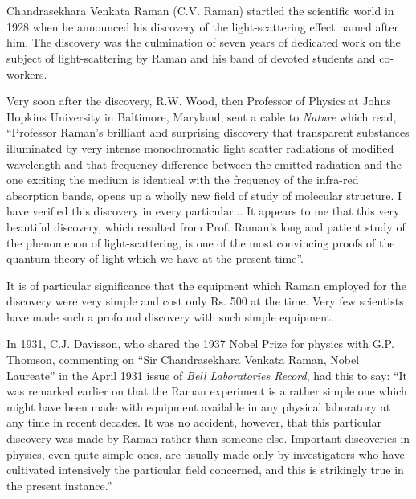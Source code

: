 \chapter{}\label{chap1}

\smallskip




\noindent
Chandrasekhara Venkata Raman (C.V. Raman) startled the scientific world in 1928 when he announced his discovery of the  light-scattering effect named after him. The discovery was the culmination of seven years of dedicated work on the subject of light-scattering by Raman and his band of devoted students and co-workers.

Very soon after the discovery, R.W. Wood, then Professor of Physics at Johns Hopkins University in Baltimore, \hbox{Maryland}, sent a cable to {\em Nature} which read, ``Professor Raman's brilliant and surprising discovery that transparent substances illuminated by very intense monochromatic light scatter radiations of modified wavelength and that frequency difference between the emitted radiation and the one exciting the medium is identical with the frequency of the infra-red absorption bands, opens up a wholly new field of study of molecular structure. I have verified this discovery in every particular... It appears to me that this very beautiful discovery, which resulted from Prof. Raman's long and patient study of the phenomenon of light-scattering, is one of the most convincing proofs of the quantum theory of light which we have at the present time''.

It is of particular significance that the equipment which Raman employed for the discovery were very simple and cost only Rs. 500 at the time. Very few scientists have made such a profound discovery with such simple equipment.

In 1931, C.J. Davisson, who shared the 1937 Nobel Prize for physics with G.P. Thomson, commenting on ``Sir \hbox{Chandrasekhara} Venkata Raman, Nobel Laureate'' in the April 1931 issue of {\em Bell Laboratories Record}, had this to say: ``It was remarked earlier on that the Raman experiment is a rather simple one which might have been made with equipment available in any physical laboratory at any time in recent decades. It was no accident, however, that this particular discovery was made by Raman rather than someone else. Important discoveries in physics, even quite simple ones, are usually made only by investigators who have cultivated intensively the particular field concerned, and this is strikingly true in the present instance.''

